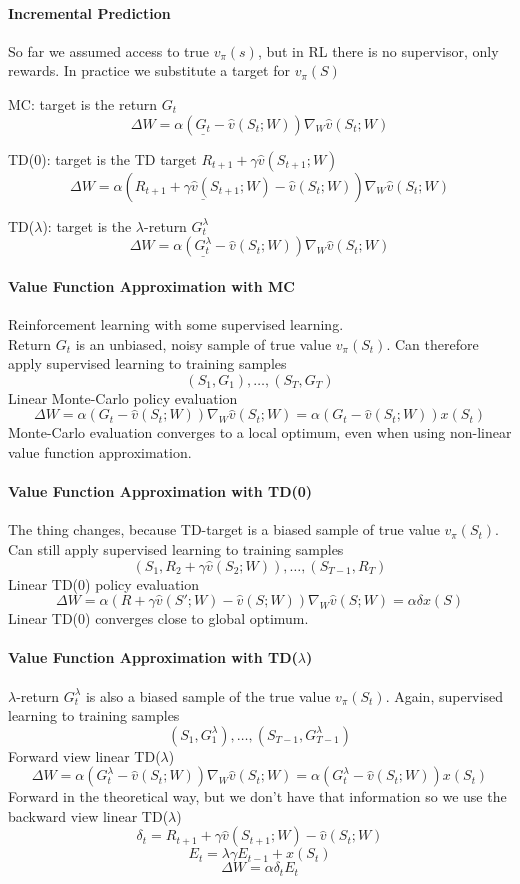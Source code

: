 \documentclass[10pt]{report}
\begin{document}
\paragraph{Incremental Prediction}
So far we assumed access to true $v_\pi(s)$, but in RL there is no supervisor, only rewards. In practice we substitute a target for $v_\pi(S)$
\begin{list}{}{}
	\item MC: target is the return $G_t$
	$$\Delta W= \alpha(\underline{G_t} - \hat{v}(S_t;W))\nabla_W\hat{v}(S_t;W)$$
	\item TD(0): target is the TD target $R_{t+1} + \gamma\hat{v}(S_{t+1};W)$
	$$\Delta W= \alpha(\underline{R_{t+1} + \gamma\hat{v}(S_{t+1};W)} - \hat{v}(S_t;W))\nabla_W\hat{v}(S_t;W)$$
	\item TD($\lambda$): target is the $\lambda$-return $G_t^\lambda$
	$$\Delta W= \alpha(\underline{G_t^\lambda} - \hat{v}(S_t;W))\nabla_W\hat{v}(S_t;W)$$
\end{list}
\paragraph{Value Function Approximation with MC} Reinforcement learning with some supervised learning.\\
Return $G_t$ is an unbiased, noisy sample of true value $v_\pi(S_t)$. Can therefore apply supervised learning to training samples
$$(S_1,G_1),\ldots,(S_T,G_T)$$
Linear Monte-Carlo policy evaluation
$$\Delta W= \alpha(G_t-\hat{v}(S_t;W))\nabla_W\hat{v}(S_t;W)=\alpha(G_t-\hat{v}(S_t;W))x(S_t)$$
Monte-Carlo evaluation converges to a local optimum, even when using non-linear value function approximation.
\paragraph{Value Function Approximation with TD(0)} The thing changes, because TD-target is a biased sample of true value $v_\pi(S_t)$. Can still apply supervised learning to training samples
$$(S_1,R_2+\gamma\hat{v}(S_2;W)),\ldots,(S_{T-1},R_T)$$
Linear TD(0) policy evaluation
$$\Delta W = \alpha(R + \gamma\hat{v}(S';W)-\hat{v}(S;W))\nabla_W\hat{v}(S;W) = \alpha\delta x(S)$$
Linear TD(0) converges close to global optimum.
\paragraph{Value Function Approximation with TD($\lambda$)} $\lambda$-return $G_t^\lambda$ is also a biased sample of the true value $v_\pi(S_t)$. Again, supervised learning to training samples
$$(S_1,G_1^\lambda),\ldots,(S_{T-1},G_{T-1}^\lambda)$$
Forward view linear TD($\lambda$)
$$\Delta W = \alpha(G_t^\lambda-\hat{v}(S_t;W))\nabla_W\hat{v}(S_t;W)=\alpha(G_t^\lambda - \hat{v}(S_t;W))x(S_t)$$
Forward in the theoretical way, but we don't have that information so we use the backward view linear TD($\lambda$)
$$\delta_t = R_{t+1} + \gamma\hat{v}(S_{t+1};W)-\hat{v}(S_t;W)$$
$$E_t=\lambda\gamma E_{t-1} + x(S_t)$$
$$\Delta W = \alpha\delta_t E_t$$
\end{document}

